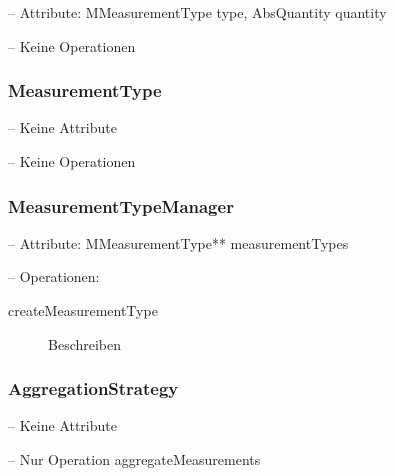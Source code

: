 
-- Attribute: MMeasurementType type, AbsQuantity quantity

-- Keine Operationen


\subsubsection{MeasurementType}


-- Keine Attribute

-- Keine Operationen


\subsubsection{MeasurementTypeManager}


-- Attribute: MMeasurementType** measurementTypes

-- Operationen:

\begin{description}
	\item[createMeasurementType] Beschreiben
\end{description}


\subsubsection{AggregationStrategy}


-- Keine Attribute

-- Nur Operation aggregateMeasurements



